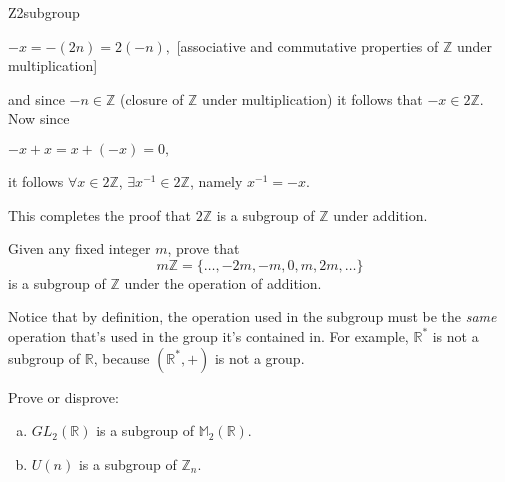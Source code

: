 \begin{example}{Z2subgroup}
\begin{itemize}
$-x = -(2n) = 2(-n),$  [associative and commutative properties of  ${\mathbb Z}$ under multiplication]
\medskip

\noindent
and since $-n \in {\mathbb Z}$ (closure of ${\mathbb Z}$ under multiplication) it follows that $-x \in 2{\mathbb Z}$. Now since
\medskip

$-x + x = x + (-x) = 0,$
\medskip

\noindent
it follows $\forall x \in 2{\mathbb Z}$, $\exists x^{-1} \in 2{\mathbb Z}$, namely $x^{-1} = -x$.
\end{itemize}

This completes the proof that  $2{\mathbb Z}$ is a subgroup of ${\mathbb Z}$ under addition.
\end{example}

\begin{exercise}{63}
Given any fixed integer $m$,  prove that
 \[m{\mathbb Z} = \{ \ldots, -2m, -m,  0, m, 2m, \ldots \}\] 
is a subgroup of ${\mathbb Z}$ under the operation of addition.
\end{exercise}


Notice that by definition, the operation used in the subgroup must be the \emph{same} operation that's used in the group it's contained in. For example,
${\mathbb R}^{\ast}$ is not a subgroup of ${\mathbb R}$, because  $({\mathbb R}^{\ast}, +)$ is not a group.


\begin{exercise}{64}
Prove or disprove:
\begin{enumerate}[(a)]
\item
$GL_2({\mathbb R})$ is a subgroup of ${\mathbb M}_2 ( {\mathbb R})$.
\item
$U(n)$ is  a subgroup of ${\mathbb Z}_n$.
\end{enumerate}
\end{exercise}
 

